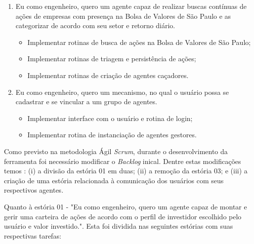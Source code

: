 \begin{enumerate}
\item Eu como engenheiro, quero um agente capaz de realizar buscas contínuas de ações de empresas com presença na Bolsa de Valores de São Paulo e as categorizar de acordo com seu setor e retorno diário.
		\begin{itemize}
		\item Implementar rotinas de busca de ações na Bolsa de Valores de São Paulo;
		\item Implementar rotinas de triagem e persistência de ações;
		\item Implementar rotinas de criação de agentes caçadores.
		\end{itemize}

\item Eu como engenheiro, quero um mecanismo, no qual o usuário possa se cadastrar e se vincular a um grupo de agentes.
		\begin{itemize}
		\item Implementar interface com o usuário e rotina de login;
		\item Implementar rotina de instanciação de agentes gestores.
		\end{itemize}

\end{enumerate}

Como previsto na metodologia Ágil \textit{Scrum}, durante o desenvolvimento da ferramenta foi necessário modificar o \textit{Backlog} inical. Dentre estas modificações temos : (i) a divisão da estória 01 em duas; (ii) a remoção da estória 03; e (iii) a criação de uma estória relacionada à comunicação dos usuários com seus respectivos agentes.

Quanto à estória 01 - "Eu como engenheiro, quero um agente capaz de montar e gerir uma carteira de ações de acordo com o perfil de investidor escolhido pelo usuário e valor investido.". Esta foi dividida nas seguintes estórias com suas respectivas tarefas:

